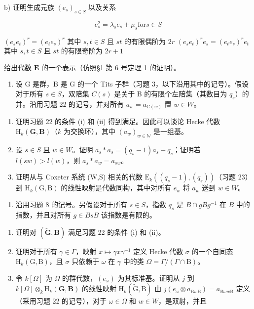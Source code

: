 b) 证明生成元族 \((e_s)_{s\in S}\) 以及关系

\[
e _ {s} ^ {2} = \lambda_ {s} e _ {s} + \mu_ {s} \mathrm{for} s \in S
\]

\((e_s e_t)^r = (e_t e_s)^r\) 其中 \(s, t \in S\) 且 \(st\) 的有限偶阶为 \(2r\) \((e_s e_t)^r e_s = (e_t e_s)^r e_t\) 其中 \(s, t \in S\) 且 \(st\) 的有限奇阶为 \(2r + 1\)

给出代数 \(\mathbf{E}\) 的一个表示（仿照§1 第 6 号定理 1 的证明）。

\begin{enumerate}
\def\labelenumi{\arabic{enumi})}
\setcounter{enumi}{23}
\tightlist
\item
  设 G 是群，B 是 G 的一个 Tits 子群（习题 3，以下沿用其中的记号）。假设对于所有 \(s \in S\)，双陪集 \(C(s)\) 是关于 B 的有限个左陪集（其数目为 \(q_{s}\)）的并。沿用习题 22 的记号，并对所有 \(a_{w} = a_{\mathrm{C}(w)}\) 置 \(w \in W\)。
\end{enumerate}

\begin{enumerate}
\def\labelenumi{\alph{enumi})}
\item
  证明习题 22 的条件 (i) 和 (ii) 得到满足。因此可以谈论 Hecke 代数 \(\mathrm{H}_k(\mathbf{G},\mathbf{B})\)（\(k\) 为交换环），其中 \((a_w)_{w\in \mathbb{W}}\) 是一组基。
\item
  设 \(s \in S\) 且 \(w \in W\)。证明 \(a_s * a_s = (q_s - 1)a_s + q_s\)；证明若 \(l(sw) > l(w)\)，则 \(a_s * a_w = a_{sw}\)。
\item
  证明从与 Coxeter 系统 (W,S) 相关的代数 \(\mathrm{E}_{k}((q_{s}-1),(q_{s}))\)（习题 23）到 \(\mathrm{H}_{k}(\mathrm{G},\mathrm{B})\) 的线性映射是代数同构，其中对所有 \(e_{w}\) 将 \(a_{w}\) 送到 \(w \in W\)。
\end{enumerate}

\begin{enumerate}
\def\labelenumi{\arabic{enumi})}
\setcounter{enumi}{24}
\tightlist
\item
  沿用习题 8 的记号。另假设对于所有 \(s \in S\)，指数 \(q_s\) 是 \(B \cap gBg^{-1}\) 在 \(B\) 中的指数，并且对所有 \(g \in BsB\) 该指数是有限的。
\end{enumerate}

\begin{enumerate}
\def\labelenumi{\alph{enumi})}
\item
  证明对 \((\tilde{\mathbf{G}},\mathbf{B})\) 满足习题 22 的条件 (i) 和 (ii)。
\item
  证明对于所有 \(\gamma \in \Gamma\)，映射 \(x \mapsto \gamma x \gamma^{-1}\) 定义 Hecke 代数 \(\sigma\) 的一个自同态 \(\mathrm{H}_k(\mathrm{G}, \mathrm{B})\)，且 \(\sigma\) 只依赖于 \(\omega\) 在 \(\gamma\) 中的类 \(\Omega = \Gamma / (\Gamma \cap \mathrm{B})\)。
\item
  令 \(k[\Omega]\) 为 \(\Omega\) 的群代数，\((e_{\omega})\) 为其标准基。证明从 \(j\) 到 \(k[\Omega] \otimes_k \mathrm{H}_k(\mathbf{G}, \mathbf{B})\) 的线性映射 \(\mathrm{H}_k(\tilde{\mathrm{G}}, \mathrm{B})\) 由 \(j(e_{\omega} \otimes a_{\mathrm{B}w\mathrm{B}}) = a_{\mathrm{B}\omega w\mathrm{B}}\) 定义（采用习题 22 的记号），对于 \(\omega \in \Omega\) 和 \(w \in W\)，是双射，并且
\end{enumerate}

